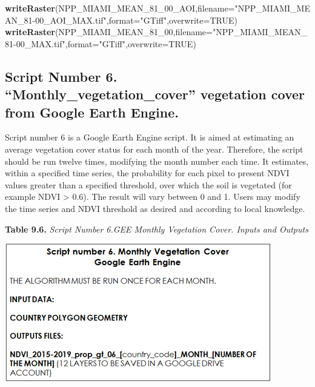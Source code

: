 \documentclass[
  10pt,
  b5paper,
]{book}
\newenvironment{Shaded}{\begin{snugshade}}{\end{snugshade}}
\newcommand{\DataTypeTok}[1]{\textcolor[rgb]{0.13,0.29,0.53}{#1}}
\newcommand{\DecValTok}[1]{\textcolor[rgb]{0.00,0.00,0.81}{#1}}
\newcommand{\KeywordTok}[1]{\textcolor[rgb]{0.13,0.29,0.53}{\textbf{#1}}}
\newcommand{\NormalTok}[1]{#1}
\newcommand{\OtherTok}[1]{\textcolor[rgb]{0.56,0.35,0.01}{#1}}
\newcommand{\StringTok}[1]{\textcolor[rgb]{0.31,0.60,0.02}{#1}}
\begin{document}
\begin{Shaded}
\begin{Highlighting}[]
\KeywordTok{writeRaster}\NormalTok{(NPP_MIAMI_MEAN_}\DecValTok{81}\NormalTok{_}\DecValTok{00}\NormalTok{_AOI,}\DataTypeTok{filename=}\StringTok{"NPP_MIAMI_MEAN_81-00_AOI_MAX.tif"}\NormalTok{,}\DataTypeTok{format=}\StringTok{"GTiff"}\NormalTok{,}\DataTypeTok{overwrite=}\OtherTok{TRUE}\NormalTok{)}
\KeywordTok{writeRaster}\NormalTok{(NPP_MIAMI_MEAN_}\DecValTok{81}\NormalTok{_}\DecValTok{00}\NormalTok{,}\DataTypeTok{filename=}\StringTok{"NPP_MIAMI_MEAN_81-00_MAX.tif"}\NormalTok{,}\DataTypeTok{format=}\StringTok{"GTiff"}\NormalTok{,}\DataTypeTok{overwrite=}\OtherTok{TRUE}\NormalTok{)}
\end{Highlighting}
\end{Shaded}

\hypertarget{script-number-6.-monthly_vegetation_cover-vegetation-cover-from-google-earth-engine.}{%
\subsection{Script Number 6. ``Monthly\_vegetation\_cover'' vegetation cover from Google Earth Engine.}\label{script-number-6.-monthly_vegetation_cover-vegetation-cover-from-google-earth-engine.}}

Script number 6 is a Google Earth Engine script. It is aimed at estimating an average vegetation cover status for each month of the year. Therefore, the script should be run twelve times, modifying the month number each time. It estimates, within a specified time series, the probability for each pixel to present NDVI values greater than a specified threshold, over which the soil is vegetated (for example NDVI \textgreater{} 0.6). The result will vary between 0 and 1. Users may modify the time series and NDVI threshold as desired and according to local knowledge.

\textbf{Table 9.6.} \emph{Script Number 6.GEE Monthly Vegetation Cover. Inputs and Outputs}

\includegraphics{tables/Table_9.5.png}
\end{document}
